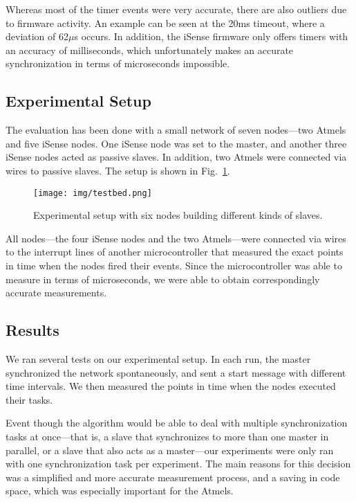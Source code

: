 Whereas most of the timer events were very accurate, there are also
outliers due to firmware activity. An example can be seen at the 20ms
timeout, where a deviation of 62$\mu$s occurs. In addition, the iSense
firmware only offers timers with an accuracy of milliseconds, which
unfortunately makes an accurate synchronization in terms of
microseconds impossible.

\subsection{Experimental Setup}

The evaluation has been done with a small network of seven nodes---two
Atmels and five iSense nodes. One iSense node was set to the master,
and another three iSense nodes acted as passive slaves. In addition,
two Atmels were connected via wires to passive slaves. The setup is
shown in Fig.~\ref{sec:exp:exp_setup}.

\begin{figure}
  \centering
  \texttt{[image: img/testbed.png]}
  \caption{Experimental setup with six nodes building different kinds
    of slaves.}
  \label{sec:exp:exp_setup}
\end{figure}

All nodes---the four iSense nodes and the two Atmels---were connected
via wires to the interrupt lines of another microcontroller that
measured the exact points in time when the nodes fired their
events. Since the microcontroller was able to measure in terms of
microseconds, we were able to obtain correspondingly accurate
measurements.

\subsection{Results}

We ran several tests on our experimental setup. In each run, the
master synchronized the network spontaneously, and sent a start
message with different time intervals. We then measured the points in
time when the nodes executed their tasks.

Event though the algorithm would be able to deal with multiple
synchronization tasks at once---that is, a slave that synchronizes to
more than one master in parallel, or a slave that also acts as a
master---our experiments were only ran with one synchronization task
per experiment. The main reasons for this decision was a simplified
and more accurate measurement process, and a saving in code space,
which was especially important for the Atmels.

